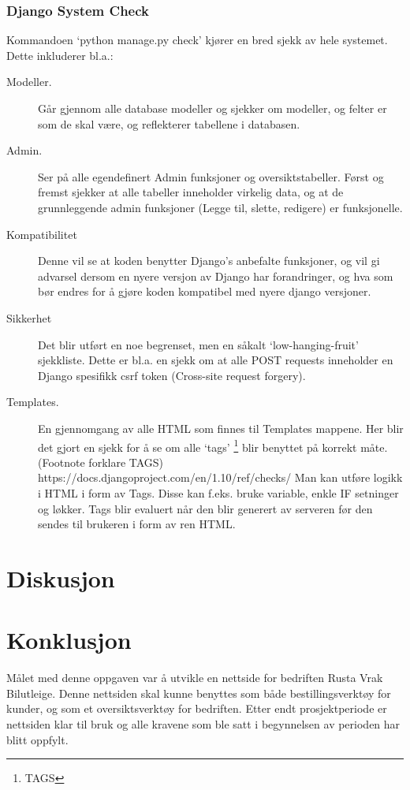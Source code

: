 \subsection{Django System Check}
Kommandoen ‘python manage.py check’ kjører en bred sjekk av hele systemet. Dette inkluderer bl.a.:
\begin{description}
\item[Modeller.]Går gjennom alle database modeller og sjekker om modeller, og felter er som de skal være, og reflekterer tabellene i databasen.
\item[Admin.]Ser på alle egendefinert Admin funksjoner og oversiktstabeller. Først og fremst sjekker at alle tabeller inneholder virkelig data, og at de grunnleggende admin funksjoner (Legge til, slette, redigere) er funksjonelle.
\item[Kompatibilitet]Denne vil se at koden benytter Django’s anbefalte funksjoner, og vil gi advarsel dersom en nyere versjon av Django har forandringer, og hva som bør endres for å gjøre koden kompatibel med nyere django versjoner.
\item[Sikkerhet]Det blir utført en noe begrenset, men en såkalt ‘low-hanging-fruit’ sjekkliste. Dette er bl.a. en sjekk om at alle POST requests inneholder en Django spesifikk csrf token (Cross-site request forgery).
\item[Templates.]En gjennomgang av alle HTML som finnes til Templates mappene. Her blir det gjort en sjekk for å se om alle ‘tags’ \footnote{TAGS} blir benyttet på korrekt måte. (Footnote forklare TAGS)
https://docs.djangoproject.com/en/1.10/ref/checks/
Man kan utføre logikk i HTML i form av Tags. Disse kan f.eks. bruke variable, enkle IF setninger og løkker. Tags blir evaluert når den blir generert av serveren før den sendes til brukeren i form av ren HTML.
\end{description}





\chapter{Diskusjon}
%


\chapter{Konklusjon}
Målet med denne oppgaven var å utvikle en nettside for bedriften Rusta Vrak Bilutleige. Denne nettsiden skal kunne benyttes som både bestillingsverktøy for kunder, og som et oversiktsverktøy for bedriften. Etter endt prosjektperiode er nettsiden klar til bruk og alle kravene som ble satt i begynnelsen av perioden har blitt oppfylt. 
